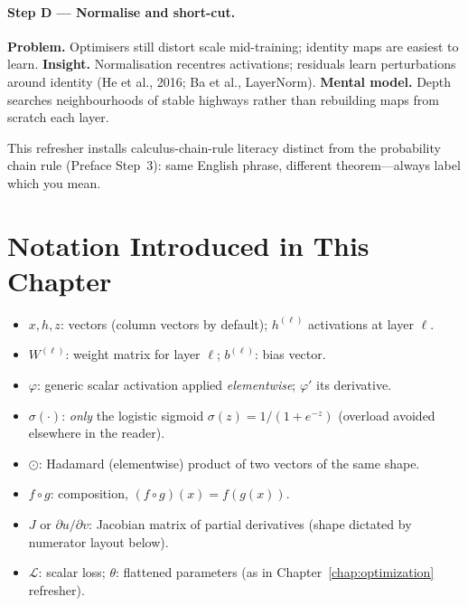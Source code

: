 \paragraph{Step D --- Normalise and short-cut.}
\textbf{Problem.} Optimisers still distort scale mid-training; identity maps are easiest to learn.
\textbf{Insight.} Normalisation recentres activations; residuals learn perturbations around identity (He et al., 2016; Ba et al., LayerNorm).
\textbf{Mental model.} Depth searches neighbourhoods of stable highways rather than rebuilding maps from scratch each layer.

This refresher installs calculus-chain-rule literacy distinct from the probability chain rule (Preface Step~3): same English phrase, different theorem---always label which you mean.

\section*{Notation Introduced in This Chapter}
\begin{itemize}[leftmargin=1.5em]
  \item \(x,h,z\): vectors (column vectors by default); \(h^{(\ell)}\) activations at layer \(\ell\).
  \item \(W^{(\ell)}\): weight matrix for layer \(\ell\); \(b^{(\ell)}\): bias vector.
  \item \(\varphi\): generic scalar activation applied \emph{elementwise}; \(\varphi'\) its derivative.
  \item \(\sigma(\cdot)\): \emph{only} the logistic sigmoid \(\sigma(z)=1/(1+e^{-z})\) (overload avoided elsewhere in the reader).
  \item \(\odot\): Hadamard (elementwise) product of two vectors of the same shape.
  \item \(f \circ g\): composition, \((f \circ g)(x)=f(g(x))\).
  \item \(J\) or \(\partial u/\partial v\): Jacobian matrix of partial derivatives (shape dictated by numerator layout below).
  \item \(\mathcal{L}\): scalar loss; \(\theta\): flattened parameters (as in Chapter~\ref{chap:optimization} refresher).
\end{itemize}

